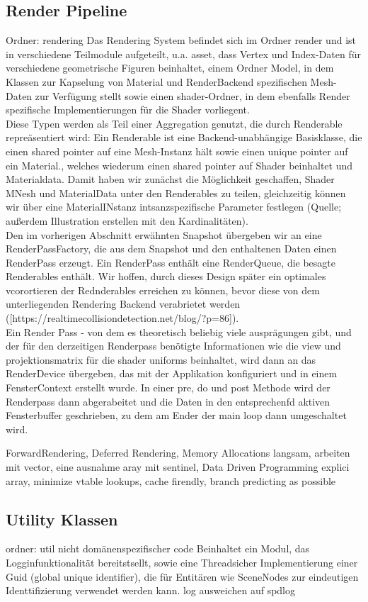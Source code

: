\subsection{Render Pipeline}
Ordner: rendering
Das Rendering System befindet sich im Ordner render und ist in verschiedene Teilmodule aufgeteilt, u.a. asset, dass Vertex und Index-Daten für verschiedene geometrische Figuren beinhaltet, einem Ordner Model, in dem Klassen zur Kapselung von Material und RenderBackend spezifischen Mesh-Daten zur Verfügung stellt sowie einen shader-Ordner, in dem ebenfalls Render spezifische Implementierungen für die Shader vorliegent.\\
Diese Typen werden als Teil einer Aggregation genutzt, die durch Renderable repreäsentiert wird: Ein Renderable ist eine Backend-unabhängige Basisklasse, die einen shared pointer auf eine Mesh-Instanz hält sowie einen unique pointer auf ein Material., welches wiederum einen shared pointer auf Shader beinhaltet und Materialdata.
Damit haben wir zunächst die Möglichkeit geschaffen, Shader MNesh und MaterialData unter den Renderables zu teilen, gleichzeitig können wir über eine MaterialINstanz intsanzspezifische Parameter festlegen (Quelle; außerdem Illustration erstellen mit den Kardinalitäten).\\
Den im vorherigen Abschnitt erwähnten Snapshot übergeben wir an eine RenderPassFactory, die aus dem Snapshot und den enthaltenen Daten einen RenderPass erzeugt. Ein RenderPass enthält eine RenderQueue, die besagte Renderables enthält. Wir hoffen, durch dieses Design später ein optimales vcorortieren der Rednderables erreichen zu können, bevor diese von dem unterliegenden Rendering Backend verabrietet werden ([https://realtimecollisiondetection.net/blog/?p=86]).\\
Ein Render Pass - von dem es theoretisch beliebig viele ausprägungen gibt, und der für den derzeitigen Renderpass benötigte Informationen wie die view und projektionsmatrix für die shader uniforms beinhaltet, wird dann an das RenderDevice übergeben, das mit der Applikation konfiguriert und in einem FensterContext erstellt wurde. In einer pre, do und post Methode wird der Renderpass dann abgerabeitet und die Daten in den entsprechenfd aktiven Fensterbuffer geschrieben, zu dem am Ender der main loop dann umgeschaltet wird.

ForwardRendering, Deferred Rendering, Memory Allocations langsam, arbeiten mit vector, eine ausnahme aray mit sentinel, Data Driven Programming explici array, minimize vtable lookups, cache firendly, branch predicting as possible

\subsection{Utility Klassen}
ordner: util
nicht domänenspezifischer code
Beinhaltet ein Modul, das Logginfunktionalität bereitstsellt, sowie eine Threadsicher Implementierung einer Guid (global unique identifier), die für Entitären wie SceneNodes zur eindeutigen Identtifizierung verwendet werden kann. log ausweichen auf spdlog
